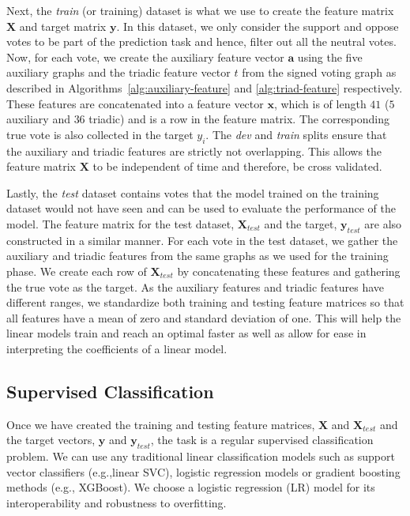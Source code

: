 Next, the \textit{train} (or training) dataset is what we use to create the feature matrix $\mathbf{X}$ and target matrix $\mathbf{y}$.
In this dataset, we only consider the support and oppose votes to be part of the prediction task and hence, filter out all the neutral votes.
Now, for each vote, we create the auxiliary feature vector $\textbf{a}$ using the five auxiliary graphs and the triadic feature vector $t$ from the signed voting graph as described in Algorithms~\ref{alg:auxiliary-feature} and \ref{alg:triad-feature} respectively.
These features are concatenated into a feature vector $\textbf{x}$, which is of length $41$ ($5$ auxiliary and $36$ triadic) and is a row in the feature matrix.
The corresponding true vote is also collected in the target $y_i$.
The \textit{dev} and \textit{train} splits ensure that the auxiliary and triadic features are strictly not overlapping.
This allows the feature matrix $\textbf{X}$ to be independent of time and therefore, be cross validated.

Lastly, the \textit{test} dataset contains votes that the model trained on the training dataset would not have seen and can be used to evaluate the performance of the model.
The feature matrix for the test dataset, $\mathbf{X}_{test}$ and the target, $\mathbf{y}_{test}$ are also constructed in a similar manner.
For each vote in the test dataset, we gather the auxiliary and triadic features from the same graphs as we used for the training phase.
We create each row of $\mathbf{X}_{test}$ by concatenating these features and gathering the true vote as the target.
As the auxiliary features and triadic features have different ranges, we standardize both training and testing feature matrices so that all features have a mean of zero and standard deviation of one.
This will help the linear models train and reach an optimal faster as well as allow for ease in interpreting the coefficients of a linear model.

\subsection{Supervised Classification}
Once we have created the training and testing feature matrices, $\mathbf{X}$ and $\mathbf{X}_{test}$ and the target vectors, $\mathbf{y}$ and $\mathbf{y}_{test}$, the task is a regular supervised classification problem.
We can use any traditional linear classification models such as support vector classifiers (e.g.,linear SVC), logistic regression models or gradient boosting methods (e.g., XGBoost).
We choose a logistic regression (LR) model for its interoperability and robustness to overfitting. 

